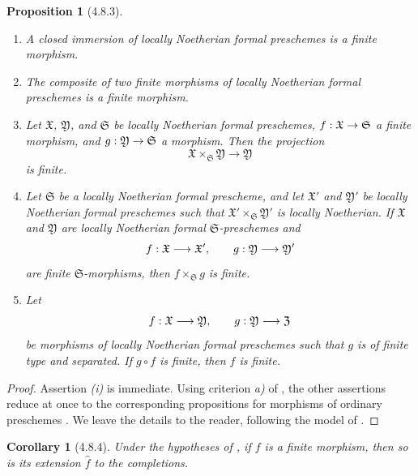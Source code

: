 \documentclass[oneside]{amsart}
\theoremstyle{ega-env-style}
\theoremstyle{ega-thm-env-style}
\newtheorem*{proposition}{Proposition}
\newtheorem*{corollary}{Corollary}
\theoremstyle{ega-defn-env-style}
\renewcommand{\to}{\mathchoice{\longrightarrow}{\rightarrow}{\rightarrow}{\rightarrow}}
\let\EGAOriginalLabel\label
\renewcommand{\label}[1]{\phantomsection\EGAOriginalLabel{#1}}
\begin{document}
\begin{proposition}[4.8.3]
\label{III.4.8.3}
\begin{enumerate}
  \item[\rm{(i)}] A closed immersion of locally Noetherian formal
    preschemes is a finite morphism.
  \item[\rm{(ii)}] The composite of two finite morphisms of locally
    Noetherian formal preschemes is a finite morphism.
  \item[\rm{(iii)}] Let $\mathfrak{X}$, $\mathfrak{Y}$, and
    $\mathfrak{S}$ be locally Noetherian formal preschemes,
    $f:\mathfrak{X}\to\mathfrak{S}$ a finite morphism, and
    $g:\mathfrak{Y}\to\mathfrak{S}$ a morphism.  Then the projection
    \[
      \mathfrak{X}\times_{\mathfrak{S}}\mathfrak{Y}
      \longrightarrow\mathfrak{Y}
    \]
    is finite.
  \item[\rm{(iv)}] Let $\mathfrak{S}$ be a locally Noetherian formal
    prescheme, and let $\mathfrak{X}'$ and $\mathfrak{Y}'$ be
    locally Noetherian formal preschemes such that
    $\mathfrak{X}'\times_{\mathfrak{S}}\mathfrak{Y}'$ is locally
    Noetherian.  If $\mathfrak{X}$ and $\mathfrak{Y}$ are locally
    Noetherian formal $\mathfrak{S}$-preschemes and
    \[
      f:\mathfrak{X}\to\mathfrak{X}',\qquad
      g:\mathfrak{Y}\to\mathfrak{Y}'
    \]
    are finite $\mathfrak{S}$-morphisms, then
    $f\times_{\mathfrak{S}}g$ is finite.
  \item[\rm{(v)}] Let
    \[
      f:\mathfrak{X}\to\mathfrak{Y},\qquad
      g:\mathfrak{Y}\to\mathfrak{Z}
    \]
    be morphisms of locally Noetherian formal preschemes such that
    $g$ is of finite type and separated.  If $g\circ f$ is finite,
    then $f$ is finite.
\end{enumerate}
\end{proposition}

\begin{proof}
Assertion \emph{(i)} is immediate.  Using criterion \emph{a)} of
, the other assertions reduce at once to the
corresponding propositions for morphisms of ordinary preschemes
.  We leave the details to the reader, following
the model of .
\end{proof}

\begin{corollary}[4.8.4]
\label{III.4.8.4}
Under the hypotheses of , if $f$ is a finite
morphism, then so is its extension $\widehat{f}$ to the
completions.
\end{corollary}
\end{document}
